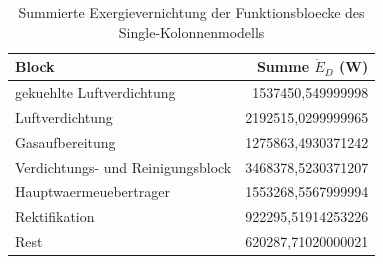 \begin{longtable}{lr}
\caption{Summierte Exergievernichtung der Funktionsbloecke des Single-Kolonnenmodells} \\
\hline
Block & Summe $\dot{E}_D$ (W) \\
\hline
gekuehlte Luftverdichtung & 1537450,549999998 \\
Luftverdichtung & 2192515,0299999965 \\
Gasaufbereitung & 1275863,4930371242 \\
Verdichtungs- und Reinigungsblock & 3468378,5230371207 \\
Hauptwaermeuebertrager & 1553268,5567999994 \\
Rektifikation & 922295,51914253226 \\
Rest & 620287,71020000021 \\
\hline
\end{longtable}